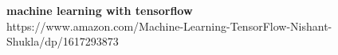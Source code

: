 \documentclass[11pt, oneside]{Thesis} %
\begin{document}
\textbf{machine learning with tensorflow}\\https://www.amazon.com/Machine-Learning-TensorFlow-Nishant-Shukla/dp/1617293873\\


\appendix %






\end{document}
